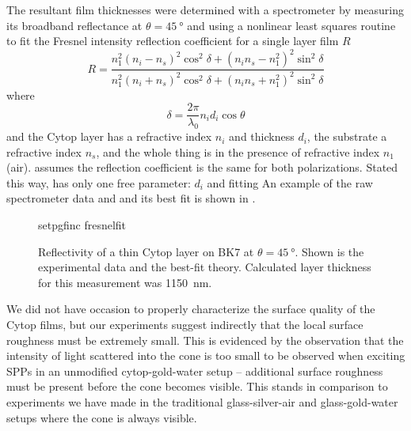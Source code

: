 The resultant film thicknesses were determined with a spectrometer by
measuring its broadband reflectance at $\theta=\SI{45}{\degree}$ and using
a nonlinear least squares routine~\cite{more1977LevAlgImpThe_2} to 
fit the Fresnel intensity reflection coefficient for a single layer
film $R$~\cite{steck2006classical} 
\begin{equation}
 R = \frac{n_1^2(n_i-n_s)^2 \cos^2\delta + (n_i n_s - n_1^2)^2\sin^2\delta}
          {n_1^2(n_i+n_s)^2 \cos^2\delta + (n_i n_s + n_1^2)^2\sin^2\delta}
          \label{eqn:fitfresnel}
\end{equation}
where
\begin{equation}
 \delta = \frac{2\pi}{\lambda_0} n_i d_i \cos \theta
\end{equation}
and the Cytop layer has a refractive index $n_i$ and thickness $d_i$, the
substrate a refractive index $n_s$, and the whole thing is in the presence
of refractive index $n_1$ (air).   assumes the
reflection coefficient is the same for both polarizations.  Stated this way,
 has only one free parameter: $d_i$ and fitting
An example of the raw spectrometer data and and its best fit is shown in
.

\begin{figure}
 \centering
 {setpgfinc}
 {fresnelfit}
 \caption{Reflectivity of a thin Cytop layer on BK7 at
 $\theta=\SI{45}{\degree}$.  Shown is the experimental data and the
 best-fit theory.  Calculated layer thickness for this measurement was
\SI{1150}{\nano\meter}.}
 \label{fig:fresnelfit}
\end{figure}

We did not have occasion to properly characterize the surface quality of
the Cytop films, but our experiments suggest indirectly that the local
surface roughness must be extremely small.  This is evidenced by the
observation that the intensity of light scattered into the cone is too
small to be observed when exciting SPPs in an unmodified cytop-gold-water
setup -- additional surface roughness must be present before the cone
becomes visible.  This stands in comparison to experiments we have made in
the traditional glass-silver-air and glass-gold-water setups where the cone
is always visible.
